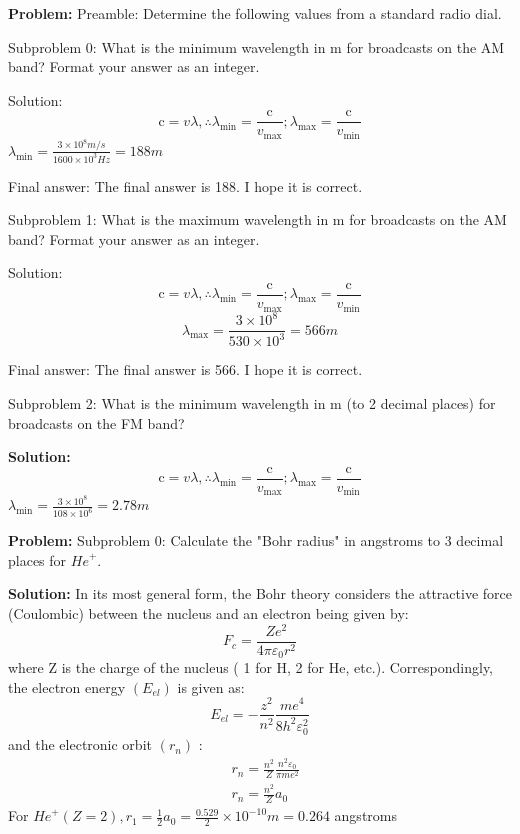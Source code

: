 \documentclass[10pt]{article}
\begin{document}
\textbf{Problem:}
Preamble: Determine the following values from a standard radio dial. 

Subproblem 0: What is the minimum wavelength in m for broadcasts on the AM band? Format your answer as an integer. 


Solution: \[
\mathrm{c}=v \lambda, \therefore \lambda_{\min }=\frac{\mathrm{c}}{v_{\max }} ; \lambda_{\max }=\frac{\mathrm{c}}{v_{\min }}
\]
$\lambda_{\min }=\frac{3 \times 10^{8} m / s}{1600 \times 10^{3} Hz}=\boxed{188} m$

Final answer: The final answer is 188. I hope it is correct.

Subproblem 1: What is the maximum wavelength in m for broadcasts on the AM band? Format your answer as an integer. 


Solution: \[
\mathrm{c}=v \lambda, \therefore \lambda_{\min }=\frac{\mathrm{c}}{v_{\max }} ; \lambda_{\max }=\frac{\mathrm{c}}{v_{\min }}
\]
\[
\lambda_{\max }=\frac{3 \times 10^{8}}{530 \times 10^{3}}=\boxed{566} m
\]

Final answer: The final answer is 566. I hope it is correct.

Subproblem 2: What is the minimum wavelength in m (to 2 decimal places) for broadcasts on the FM band? 


\textbf{Solution:}
\[
\mathrm{c}=v \lambda, \therefore \lambda_{\min }=\frac{\mathrm{c}}{v_{\max }} ; \lambda_{\max }=\frac{\mathrm{c}}{v_{\min }}
\]
$\lambda_{\min }=\frac{3 \times 10^{8}}{108 \times 10^{6}}=\boxed{2.78} m$


\textbf{Problem:}
Subproblem 0: Calculate the "Bohr radius" in angstroms to 3 decimal places for ${He}^{+}$.


\textbf{Solution:}
In its most general form, the Bohr theory considers the attractive force (Coulombic) between the nucleus and an electron being given by:
\[
F_{c}=\frac{Z e^{2}}{4 \pi \varepsilon_{0} r^{2}}
\]
where Z is the charge of the nucleus ( 1 for H, 2 for He, etc.). Correspondingly, the electron energy $\left(E_{e l}\right)$ is given as:
\[
E_{e l}=-\frac{z^{2}}{n^{2}} \frac{m e^{4}}{8 h^{2} \varepsilon_{0}^{2}}
\]
and the electronic orbit $\left(r_{n}\right)$ :
\[
\begin{aligned}
&r_{n}=\frac{n^{2}}{Z} \frac{n^{2} \varepsilon_{0}}{\pi m e^{2}} \\
&r_{n}=\frac{n^{2}}{Z} a_{0}
\end{aligned}
\]
For ${He}^{+}(Z=2), {r}_{1}=\frac{1}{2} {a}_{0}=\frac{0.529}{2} \times 10^{-10} m=\boxed{0.264}$ angstroms
\end{document}
